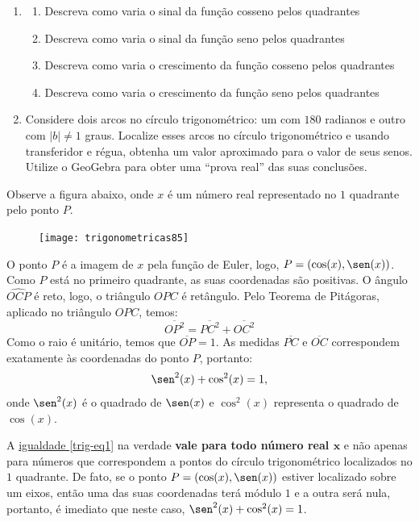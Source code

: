 \begin{enumerate}
\item
\begin{enumerate}
\item Descreva como varia o sinal da função cosseno pelos quadrantes
\item Descreva como varia o sinal da função seno pelos quadrantes
\item Descreva como varia o crescimento da função cosseno pelos quadrantes
\item Descreva como varia o crescimento da função seno pelos quadrantes
\end{enumerate}
\item Considere dois arcos no círculo trigonométrico: um com $180$ radianos e outro com $|b|\neq1$ graus. Localize esses arcos no círculo trigonométrico e usando transferidor e régua, obtenha um valor aproximado para o valor de seus senos. Utilize o GeoGebra para obter uma “prova real” das suas conclusões.
\end{enumerate}


Observe a figura abaixo, onde $x$ é um número real representado no $1$ quadrante pelo ponto $P$.

\begin{figure}[H]
\centering

\texttt{[image: trigonometricas85]}

\end{figure}


O ponto $P$ é a imagem de $x$ pela função de Euler, logo, $P = (\cos(x), \sen(x))$. Como $P$ está no primeiro quadrante, as suas coordenadas são positivas. O ângulo $\widehat{OCP}$ é reto, logo, o triângulo $OPC$ é retângulo. Pelo Teorema de Pitágoras, aplicado no triângulo $OPC$, temos:
\begin{equation*}
\overline{OP^2}=\overline{PC^2}+\overline{OC^2}
\end{equation*}
Como o raio é unitário, temos que $\overline{OP}=1$. As medidas $\overline{PC}$ e $\overline{OC}$ correspondem exatamente às coordenadas do ponto $P$, portanto:
\begin{equation}
\label{trig-eq1}
\sen^2(x)+\cos^2(x)=1,
\end{equation}
onde $\sen^2(x)$ é o quadrado de $\sen(x)$ e $\cos^2(x)$ representa o quadrado de $\cos(x)$.


A \hyperref[trig-eq1]{igualdade \ref{trig-eq1}} na verdade \textbf{vale para todo número real $\bm{x}$} e não apenas para números que correspondem a pontos do círculo trigonométrico localizados no $1$ quadrante. De fato, se o ponto $P=(\cos(x),\sen(x))$ estiver localizado sobre um eixos, então uma das suas coordenadas terá módulo $1$ e a outra será nula, portanto, é imediato que neste caso, $\sen^2(x)+\cos^2(x)=1$.

